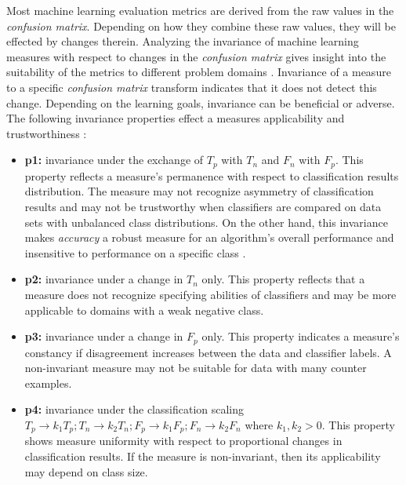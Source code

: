 \documentclass[10pt]{unbthesis}
\begin{document}
Most machine learning evaluation metrics are derived from the raw
values in the \textit{confusion matrix}. Depending on how they combine
these raw values, they will be effected by changes therein. Analyzing
the invariance of machine learning measures with respect to changes in
the \textit{confusion matrix} gives insight into the suitability of
the metrics to different problem domains
\cite{RefWorks:36}. Invariance of a measure to a specific
\textit{confusion matrix} transform indicates that it does not detect
this change. Depending on the learning goals, invariance can be
beneficial or adverse. The following invariance properties effect
a measures applicability and trustworthiness \cite{RefWorks:36}:

\begin{itemize}
  \item \textbf{p1:} invariance under the exchange of \(T_p\) with
    \(T_n\) and \(F_n\) with \(F_p\). This property reflects a
    measure's permanence with respect to classification results
    distribution. The measure may not recognize asymmetry of
    classification results and may not be trustworthy when classifiers
    are compared on data sets with unbalanced class distributions. On the
    other hand, this invariance makes \textit{accuracy} a robust
    measure for an algorithm's overall performance and insensitive to
    performance on a specific class \cite{RefWorks:33}.

  \item \textbf{p2:} invariance under a change in \(T_n\) only. This
    property reflects that a measure does not recognize specifying
    abilities of classifiers and may be more applicable to domains
    with a weak negative class.
  
  \item \textbf{p3:} invariance under a change in \(F_p\) only. This
    property indicates a measure's constancy if disagreement increases
    between the data and classifier labels. A non-invariant measure
    may not be suitable for data with many counter examples.

  \item \textbf{p4:} invariance under the classification scaling \(T_p
    \rightarrow k_1 T_p; T_n \rightarrow k_2 T_n; F_p \rightarrow k_1
    F_p; F_n \rightarrow k_2 F_n\) where \(k_1,k_2 > 0\). This property
    shows measure uniformity with respect to proportional changes in
    classification results. If the measure is non-invariant, then its
    applicability may depend on class size.

 \end{itemize}
\end{document}
